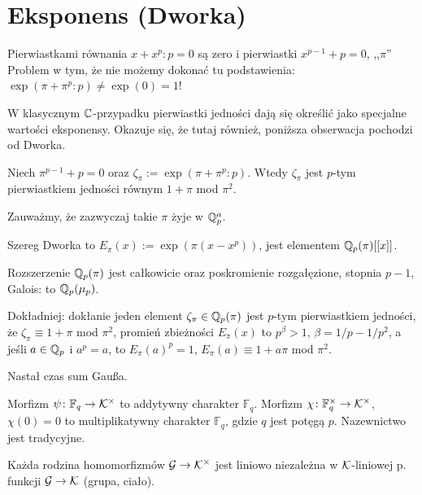 \section{Eksponens (Dworka)}
Pierwiastkami  równania $x + x^p:p = 0$ są zero i pierwiastki $x^{p-1} + p = 0$, ,,$\pi$''
Problem w tym, że nie możemy dokonać tu podstawienia: $\exp(\pi + \pi^p:p) \neq \exp(0) = 1$!

W klasycznym $\mathbb C$-przypadku pierwiastki jedności dają się określić jako specjalne wartości eksponensy.
Okazuje się, że tutaj również, poniższa obserwacja pochodzi od Dworka.

\begin{fakt}
	Niech $\pi^{p-1} + p = 0$ oraz $\zeta_\pi := \exp(\pi + \pi^p:p)$.
	Wtedy $\zeta_\pi$ jest $p$-tym pierwiastkiem jedności równym $1 + \pi$ mod $\pi^2$.
\end{fakt}

Zauważmy, że zazwyczaj takie $\pi$ żyje w $\mathbb Q_p^a$.

\begin{definicja}
	Szereg Dworka to $E_\pi(x) := \exp(\pi(x-x^p))$, jest elementem $\mathbb Q_p(\pi)[[x]]$.
\end{definicja}

\begin{twierdzenie}[Dwork]
	Rozszerzenie $\mathbb Q_p(\pi)$ jest całkowicie oraz poskromienie rozgałęzione, stopnia $p-1$, Galois: to $\mathbb Q_p(\mu_p)$.
\end{twierdzenie}

Dokładniej: dokłanie jeden element $\zeta_\pi \in \mathbb Q_p(\pi)$ jest $p$-tym pierwiastkiem jedności, że $\zeta_\pi \equiv 1 + \pi$ mod $\pi^2$, promień zbieżności $E_\pi(x)$ to $p^\beta > 1$, $\beta = 1/p - 1/p^2$, a jeśli $a \in \mathbb Q_p$ i $a^p = a$, to $E_\pi(a)^p = 1$, $E_\pi(a) \equiv 1 + a\pi$ mod $\pi^2$.

Nastał  czas sum Gaußa.

\begin{definicja}
	Morfizm $\psi \colon \mathbb F_q \to \mathcal K^\times$ to addytywny charakter $\mathbb F_q$.
	Morfizm $\chi \colon \mathbb F_q^\times \to \mathcal K^\times$, $\chi(0) = 0$ to multiplikatywny charakter $\mathbb F_q$, gdzie $q$ jest potęgą $p$.
	Nazewnictwo jest tradycyjne.
\end{definicja}

\begin{fakt}
	Każda rodzina homomorfizmów $\mathcal G \to \mathcal K^\times$ jest liniowo niezależna w $\mathcal K$-liniowej p. funkcji $\mathcal G \to \mathcal K$ (grupa, ciało).
\end{fakt}

